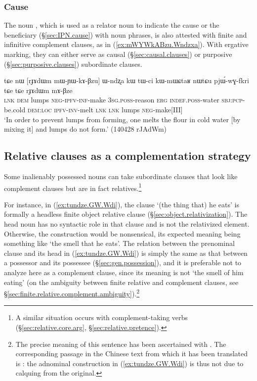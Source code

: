  
\subsubsection{Cause} \label{sec:nouns.cause.complement}
The noun , which is used as a relator noun to indicate the cause or the beneficiary (§\ref{sec:IPN.cause}) with noun phrases, is also attested with finite and infinitive complement clauses, as in (\ref{ex:mWYWkABzu.Wndzxa}). With ergative marking, they can either serve as causal (§\ref{sec:causal.clauses}) or purposive (§\ref{sec:purposive.clauses}) subordinate clauses.


\begin{exe}
\ex  \label{ex:mWYWkABzu.Wndzxa}
\gll tɕe nɯ [rɟɤdɯm mɯ-ɲɯ-kɤ-βzu] ɯ-ndʐa kɯ tɯ-ci kɯ-mɯɕtaʁ nɯtɕu pjɯ́-wɣ-fkri tɕe tɕe rɟɤdɯm mɤ-βze \\
\textsc{lnk} \textsc{dem} lumps  \textsc{neg}-\textsc{ipfv}-\textsc{inf}-make \textsc{3sg}.\textsc{poss}-reason \textsc{erg} \textsc{indef}.\textsc{poss}-water \textsc{sbj}:\textsc{pcp}-be.cold \textsc{dem}:\textsc{loc} \textsc{ipfv}-\textsc{inv}-melt \textsc{lnk} \textsc{lnk} lumps \textsc{neg}-make[III] \\
\glt `In order to prevent lumps from forming, one melts the flour in cold water [by mixing it] and lumps do not form.' (140428 rJAdWm)
\end{exe} 

\subsection{Relative clauses as a complementation strategy} \label{sec:relative.clause.compl.strategy}
Some inalienably possessed nouns can take subordinate clauses that look like complement clauses but are in fact relatives.\footnote{A similar situation occurs with complement-taking verbs (§\ref{sec:relative.core.arg}, §\ref{sec:relative.pretence}). }

For instance, in (\ref{ex:tundze.GW.Wdi}), the clause  `(the thing that) he eats' is formally a headless finite object relative clause (§\ref{sec:object.relativization}). The head noun  has no syntactic role in that clause and is not the relativized element. Otherwise, the construction would be nonsensical, its expected meaning being something like `the smell that he eats'. The relation between the prenominal clause and its head in (\ref{ex:tundze.GW.Wdi}) is simply the same as that between a possessor and its possessee (§\ref{sec:gen.possession}), and it is preferable not to analyze here  as a complement clause, since its meaning is not `the smell of him eating' (on the ambiguity between finite relative and complement clauses, see §\ref{sec:finite.relative.complement.ambiguity}).\footnote{The precise meaning of this sentence has been ascertained with . The corresponding passage in the Chinese text from which it has been translated is : the adnominal construction in (\ref{ex:tundze.GW.Wdi}) is thus not due to calquing from the original. }

